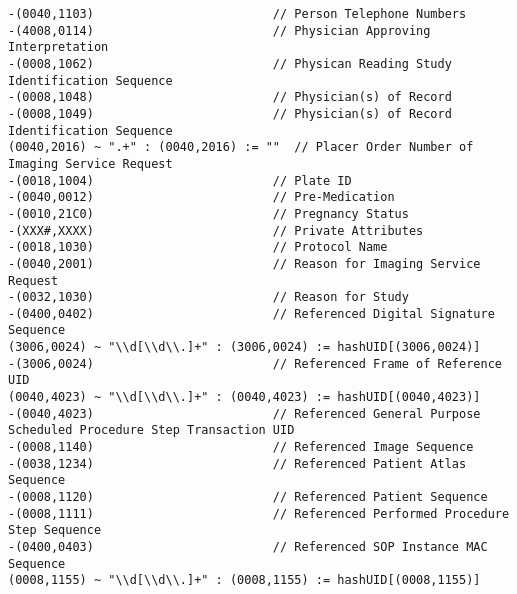 \documentclass{beamer}  %
\begin{document}
\begin{frame}[fragile]
\tiny
\begin{verbatim}
-(0040,1103)                         // Person Telephone Numbers
-(4008,0114)                         // Physician Approving Interpretation
-(0008,1062)                         // Physican Reading Study Identification Sequence
-(0008,1048)                         // Physician(s) of Record
-(0008,1049)                         // Physician(s) of Record Identification Sequence
(0040,2016) ~ ".+" : (0040,2016) := ""  // Placer Order Number of Imaging Service Request
-(0018,1004)                         // Plate ID
-(0040,0012)                         // Pre-Medication
-(0010,21C0)                         // Pregnancy Status
-(XXX#,XXXX)                         // Private Attributes
-(0018,1030)                         // Protocol Name
-(0040,2001)                         // Reason for Imaging Service Request
-(0032,1030)                         // Reason for Study
-(0400,0402)                         // Referenced Digital Signature Sequence
(3006,0024) ~ "\\d[\\d\\.]+" : (3006,0024) := hashUID[(3006,0024)]
-(3006,0024)                         // Referenced Frame of Reference UID
(0040,4023) ~ "\\d[\\d\\.]+" : (0040,4023) := hashUID[(0040,4023)]
-(0040,4023)                         // Referenced General Purpose Scheduled Procedure Step Transaction UID
-(0008,1140)                         // Referenced Image Sequence
-(0038,1234)                         // Referenced Patient Atlas Sequence
-(0008,1120)                         // Referenced Patient Sequence
-(0008,1111)                         // Referenced Performed Procedure Step Sequence
-(0400,0403)                         // Referenced SOP Instance MAC Sequence
(0008,1155) ~ "\\d[\\d\\.]+" : (0008,1155) := hashUID[(0008,1155)]                                     
\end{verbatim}
\end{frame}
\end{document}

